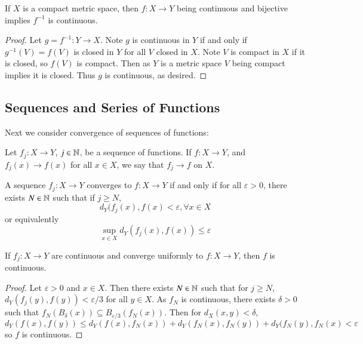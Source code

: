 \begin{prop}\label{prop:3.1.5}
    If $X$ is a compact metric space, then $f:X\rightarrow Y$ being continuous and bijective implies $f^{-1}$ is continuous.
\end{prop}
\begin{proof}
    Let $g= f^{-1}:Y\rightarrow X$. Note $g$ is continuous in $Y$ if and only if $g^{-1}(V) = f(V)$ is closed in $Y$ for all $V$ closed in $X$. Note $V$ is compact in $X$ if it is closed, so $f(V)$ is compact. Then as $Y$ is a metric space $V$ being compact implies it is closed. Thus $g$ is continuous, as desired.
\end{proof}


\subsection{Sequences and Series of Functions}

Next we consider convergence of sequences of functions: 

\begin{defn}
    Let $f_j:X\rightarrow Y$, $j \in \mathbb N$, be a sequence of functions. If $f:X\rightarrow Y$, and $f_j(x)\rightarrow f(x)$ for all $x \in X$, we say that $f_j\rightarrow f$  on $X$.
\end{defn}

\begin{defn}
    A sequence $f_j:X\rightarrow Y$ converges  to $f:X\rightarrow Y$ if and only if for all $\varepsilon > 0$, there exists $N \in \mathbb N$ such that if $j \geq N$, $$d_Y(f_j(x),f(x) < \varepsilon,\forall x \in X$$ or equivalently $$\sup_{x \in X}d_Y(f_j(x),f(x)) \leq \varepsilon$$
\end{defn}

\begin{prop}\label{prop:3.2.1}
    If $f_j:X\rightarrow Y$ are continuous and converge uniformly to $f:X\rightarrow Y$, then $f$ is continuous.
\end{prop}
\begin{proof}
    Let $\varepsilon > 0$ and $x \in X$. Then there exists $N \in \mathbb N$ such that for $j \geq N$, $d_Y(f_j(y),f(y)) < \varepsilon/3$ for all $y \in X$. As $f_N$ is continuous, there exists $\delta > 0$ such that $f_N(B_{\delta}(x)) \subseteq B_{\varepsilon/3}(f_N(x))$. Then for $d_X(x,y) < \delta$, $$d_Y(f(x),f(y)) \leq d_Y(f(x),f_N(x)) + d_Y(f_N(x),f_N(y)) + d_Y(f_N(y),f_N(x) < \varepsilon$$ so $f$ is continuous.
\end{proof}

